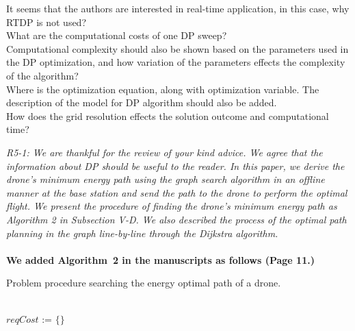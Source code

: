 \documentclass[onecolumn]{IEEEconf}
\let\oldnl\nl%
\newcommand{\nonl}{\renewcommand{\nl}{\let\nl\oldnl}}
\begin{document}
\begin{description}
{    It seems that the authors are interested in real-time application, in this case, why RTDP is not used? ~\\
    What are the computational costs of one DP sweep?~\\
    Computational complexity should also be shown based on the parameters used in the DP optimization, and how variation of the parameters effects the complexity of the algorithm?~\\
    Where is the optimization equation, along with optimization variable. The description of the model for DP algorithm should also be added.~\\
    How does the grid resolution effects the solution outcome and computational time?~\\
	}
	\item \textit
	{
	R5-1: We are thankful for the review of your kind advice. We agree that the information about DP should be useful to the reader. In this paper, we derive the drone's minimum energy path using the graph search algorithm in an offline manner at the base station and send the path to the drone to perform the optimal flight.
    We present the procedure of finding the drone's minimum energy path as Algorithm 2 in Subsection V-D.
    We also described the process of the optimal path planning in the graph line-by-line through the Dijkstra algorithm.
	}
	~\\
    \pagebreak ~\\
	\textbf{We added Algorithm~2 in the manuscripts as follows (Page 11.)}
    \SetNlSty{}{\color{red}}{:}
    \SetAlFnt{\color{red}}
    \setcounter{algocf}{1}
    \begin{algorithm}[h]
    \caption{Problem procedure searching the energy optimal path of a drone.}
    \KwIn{\\
    \hskip1.5em $G$ // A created graph  \\
    \hskip1.5em $n_s$ // A source node  \\
    \hskip1.5em $n_d$ // A destination node 
    }
    \nonl \hrulefill \\
    $reqCost$ := $\{\}$  \\

\end{algorithm}
\end{description}
\end{document}
